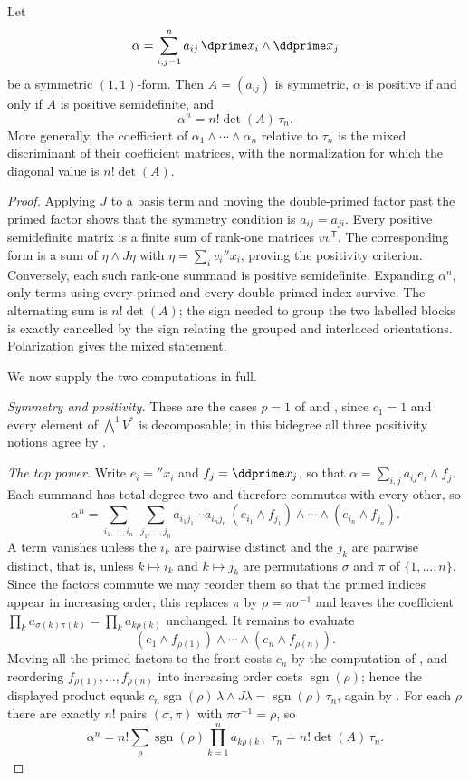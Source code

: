 \begin{proposition}
\label{prop:superform-matrix-wedge}
Let
\[
 \alpha=\sum_{i,j=1}^n a_{ij}\,
                    \dprime x_i\wedge\ddprime x_j
\]
be a symmetric $(1,1)$-form. Then $A=(a_{ij})$ is symmetric,
$\alpha$ is positive if and only if $A$ is positive semidefinite, and
\[
 \alpha^n=n!\det(A)\,\tau_n.
\]
More generally, the coefficient of
$\alpha_1\wedge\cdots\wedge\alpha_n$ relative to $\tau_n$ is the mixed
discriminant of their coefficient matrices, with the normalization for which
the diagonal value is $n!\det(A)$.
\end{proposition}
\begin{proof}
Applying $J$ to a basis term and moving the double-primed factor past the
primed factor shows that the symmetry condition is $a_{ij}=a_{ji}$.  Every
positive semidefinite matrix is a finite sum of rank-one matrices
$vv^{\mathsf T}$.  The corresponding form is a sum of
$\eta\wedge J\eta$ with $\eta=\sum_i v_i\dprime x_i$, proving the positivity
criterion.  Conversely, each such rank-one summand is positive
semidefinite.  Expanding $\alpha^n$, only terms using every primed and every
double-primed index survive.  The alternating sum is $n!\det(A)$; the sign
needed to group the two labelled blocks is exactly cancelled by the sign
relating the grouped and interlaced orientations.  Polarization gives the
mixed statement.

We now supply the two computations in full.

\emph{Symmetry and positivity.}  These are the cases $p=1$ of
 and
, since $c_1=1$ and every element of
$\bigwedge^1V^*$ is decomposable; in this bidegree all three positivity
notions agree by .

\emph{The top power.}  Write $e_i=\dprime x_i$ and $f_j=\ddprime x_j$, so
that $\alpha=\sum_{i,j}a_{ij}e_i\wedge f_j$.  Each summand has total degree
two and therefore commutes with every other, so
\[
 \alpha^n
 =\sum_{i_1,\ldots,i_n}\ \sum_{j_1,\ldots,j_n}
   a_{i_1j_1}\cdots a_{i_nj_n}\,
   (e_{i_1}\wedge f_{j_1})\wedge\cdots\wedge(e_{i_n}\wedge f_{j_n}).
\]
A term vanishes unless the $i_k$ are pairwise distinct and the $j_k$ are
pairwise distinct, that is, unless $k\mapsto i_k$ and $k\mapsto j_k$ are
permutations $\sigma$ and $\pi$ of $\{1,\ldots,n\}$.  Since the factors
commute we may reorder them so that the primed indices appear in increasing
order; this replaces $\pi$ by $\rho=\pi\sigma^{-1}$ and leaves the coefficient
$\prod_ka_{\sigma(k)\pi(k)}=\prod_ka_{k\rho(k)}$ unchanged.  It remains to
evaluate
\[
 (e_1\wedge f_{\rho(1)})\wedge\cdots\wedge(e_n\wedge f_{\rho(n)}).
\]
Moving all the primed factors to the front costs $c_n$ by the computation of
, and reordering
$f_{\rho(1)},\ldots,f_{\rho(n)}$ into increasing order costs
$\operatorname{sgn}(\rho)$; hence the displayed product equals
$c_n\operatorname{sgn}(\rho)\,\lambda\wedge J\lambda
=\operatorname{sgn}(\rho)\,\tau_n$, again by
.  For each $\rho$ there are exactly $n!$ pairs
$(\sigma,\pi)$ with $\pi\sigma^{-1}=\rho$, so
\[
 \alpha^n
 =n!\sum_{\rho}\operatorname{sgn}(\rho)\prod_{k=1}^na_{k\rho(k)}\;\tau_n
 =n!\det(A)\,\tau_n .
\]


\end{proof}
